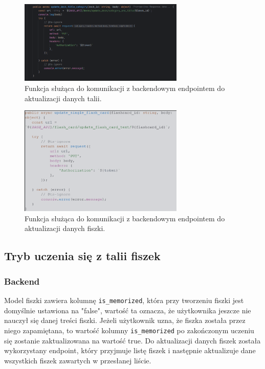 \begin{figure}[H]
    \centering
    \includegraphics[width=0.7\textwidth]{chapters/chapter_8/screens/update_deck_web}
    \caption{Funkcja służąca do komunikacji z backendowym endpointem do aktualizacji danych talii.}
    \label{img:update_deck_web}
\end{figure}

\begin{figure}[H]
    \centering
    \includegraphics[width=0.7\textwidth]{chapters/chapter_8/screens/update_flash_card_text_web}
    \caption{Funkcja służąca do komunikacji z backendowym endpointem do aktualizacji danych fiszki.}
    \label{img:update_flash_card_web}
\end{figure}

\subsection{Tryb uczenia się z talii fiszek}

\subsubsection{Backend}

Model fiszki zawiera kolumnę \texttt{is\_memorized}, która przy tworzeniu fiszki jest domyślnie ustawiona na "false", wartość ta oznacza, że użytkownika jeszcze nie nauczył się danej treści fiszki. Jeżeli użytkownik uzna, że fiszka została przez niego zapamiętana, to wartość kolumny \texttt{is\_memorized} po zakończonym uczeniu się zostanie zaktualizowana na wartość true. Do aktualizacji danych fiszek została wykorzystany endpoint, który przyjmuje listę fiszek i następnie aktualizuje dane wszystkich fiszek zawartych w przesłanej liście.

